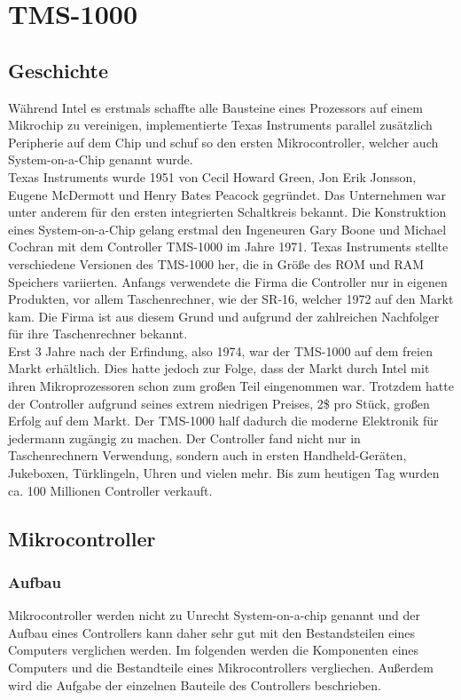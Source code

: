 \chapter{TMS-1000}

\newpage

\section{Geschichte}

W{\"a}hrend Intel es erstmals schaffte alle Bausteine eines Prozessors auf einem Mikrochip zu vereinigen, implementierte Texas Instruments parallel zus{\"a}tzlich Peripherie auf dem Chip und schuf so den ersten Mikrocontroller, welcher auch System-on-a-Chip genannt wurde. \\
Texas Instruments wurde 1951 von Cecil Howard Green, Jon Erik Jonsson, Eugene McDermott und Henry Bates Peacock gegr{\"u}ndet. Das Unternehmen war unter anderem f{\"u}r den ersten integrierten Schaltkreis bekannt. Die Konstruktion eines System-on-a-Chip gelang erstmal den Ingeneuren Gary Boone und Michael Cochran mit dem Controller TMS-1000 im Jahre 1971. Texas Instruments stellte verschiedene Versionen des TMS-1000 her, die in Gr{\"o}{\ss}e des ROM und RAM Speichers variierten. Anfangs verwendete die Firma die Controller nur in eigenen Produkten, vor allem Taschenrechner, wie der SR-16, welcher 1972 auf den Markt kam. Die Firma ist aus diesem Grund und aufgrund der zahlreichen Nachfolger f{\"u}r ihre Taschenrechner bekannt. \\
Erst 3 Jahre nach der Erfindung, also 1974, war der TMS-1000 auf dem freien Markt erh{\"a}ltlich. Dies hatte jedoch zur Folge, dass der Markt durch Intel mit ihren Mikroprozessoren schon zum gro{\ss}en Teil eingenommen war. Trotzdem hatte der Controller aufgrund seines extrem niedrigen Preises, 2\$ pro St{\"u}ck, gro{\ss}en Erfolg auf dem Markt. Der TMS-1000 half dadurch die moderne Elektronik f{\"u}r jedermann zug{\"a}ngig zu machen. Der Controller fand nicht nur in Taschenrechnern Verwendung, sondern auch in ersten Handheld-Ger{\"a}ten, Jukeboxen, T{\"u}rklingeln, Uhren und vielen mehr. Bis zum heutigen Tag wurden ca. 100 Millionen Controller verkauft.

\section{Mikrocontroller}
\subsection{Aufbau}
Mikrocontroller werden nicht zu Unrecht System-on-a-chip genannt und der Aufbau eines Controllers kann daher sehr gut mit den Bestandsteilen eines Computers verglichen werden. Im folgenden werden die Komponenten eines Computers und die Bestandteile eines Mikrocontrollers vergliechen. Au{\ss}erdem wird die Aufgabe der einzelnen Bauteile des Controllers beschrieben. 


